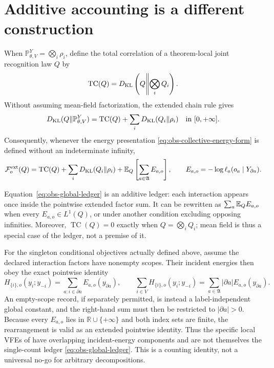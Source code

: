 \section{Additive accounting is a different construction}
\label{sec:local-additive-accounting}

When \(\mathbb P_{\theta,V}^{Y}=\bigotimes_i\rho_i\), define the total
correlation of a theorem-local joint recognition law \(Q\) by
\begin{equation}
\operatorname{TC}(Q)=D_{\mathrm{KL}}\left(Q\middle\Vert\bigotimes_iQ_i\right).
\label{eq:obs-total-correlation}
\end{equation}
Without assuming mean-field factorization, the extended chain rule gives
\begin{equation}
D_{\mathrm{KL}}(Q\Vert\mathbb P_{\theta,V}^{Y})
=\operatorname{TC}(Q)+\sum_iD_{\mathrm{KL}}(Q_i\Vert\rho_i)
\quad\text{in }[0,+\infty].
\label{eq:obs-correlated-complexity-ledger}
\end{equation}
Consequently, whenever the energy presentation
\eqref{eq:obs-collective-energy-form} is defined without an indeterminate
infinity,
\begin{equation}
\mathcal F_o^{\rm ext}(Q)
=\operatorname{TC}(Q)
+\sum_iD_{\mathrm{KL}}(Q_i\Vert\rho_i)
+\mathbb E_Q\left[\sum_{a\in\mathfrak A}E_{a,o}\right],
\qquad E_{a,o}=-\log\ell_a(o_a\mid Y_{\partial a}).
\label{eq:obs-global-ledger}
\end{equation}

Equation~\eqref{eq:obs-global-ledger} is an additive ledger: each interaction
appears once inside the pointwise extended factor sum.  It can be rewritten as
$\sum_a\mathbb E_QE_{a,o}$ when every $E_{a,o}\in L^1(Q)$, or under another
condition excluding opposing infinities.  Moreover,
$\operatorname{TC}(Q)=0$ exactly when $Q=\bigotimes_iQ_i$; mean field is thus a
special case of the ledger, not a premise of it.

For the singleton conditional objectives actually defined above, assume the
declared interaction factors have nonempty scopes.  Their incident energies
then obey the exact pointwise identity
\begin{equation}
H_{\{i\},o}(y_i;y_{-i})
=\sum_{a:i\in\partial a}E_{a,o}(y_{\partial a}),
\qquad
\sum_{i\in V}H_{\{i\},o}(y_i;y_{-i})
=\sum_{a\in\mathfrak A}|\partial a|E_{a,o}(y_{\partial a}).
\label{eq:obs-singleton-incident-counting}
\end{equation}
An empty-scope record, if separately permitted, is instead a label-independent
global constant, and the right-hand sum must then be restricted to
$|\partial a|>0$.  Because every
$E_{a,o}$ lies in
$\mathbb R\cup\{+\infty\}$ and both index sets are finite, the rearrangement
is valid as an extended pointwise identity.  Thus the specific local VFEs of
 have overlapping incident-energy
components and are not themselves the single-count ledger
\eqref{eq:obs-global-ledger}.  This is a counting identity, not a universal
no-go for arbitrary decompositions.

